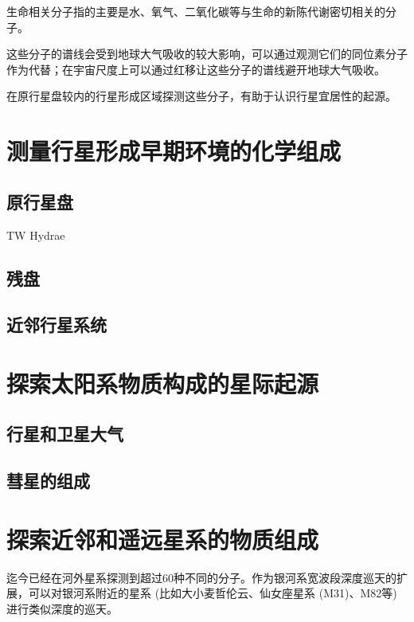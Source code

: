 \documentclass[a4paper]{article}
\newcommand\twh{TW Hydrae}
\begin{document}
生命相关分子指的主要是水、氧气、二氧化碳等与生命的新陈代谢密切相关的分子。

这些分子的谱线会受到地球大气吸收的较大影响，可以通过观测它们的同位素分子作为代替；在宇宙尺度上可以通过红移让这些分子的谱线避开地球大气吸收。

在原行星盘较内的行星形成区域探测这些分子，有助于认识行星宜居性的起源。

\section{测量行星形成早期环境的化学组成}

\subsection{原行星盘}

\twh

\subsection{残盘}

\subsection{近邻行星系统}



\section{探索太阳系物质构成的星际起源}

\subsection{行星和卫星大气}

\subsection{彗星的组成}

\section{探索近邻和遥远星系的物质组成}

迄今已经在河外星系探测到超过60种不同的分子。作为银河系宽波段深度巡天的扩展，可以对银河系附近的星系 (比如大小麦哲伦云、仙女座星系 (M31)、M82等) 进行类似深度的巡天。
\end{document}
